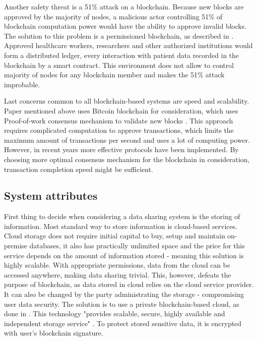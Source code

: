 \documentclass[12pt]{article}
\begin{document}
        Another safety threat is a 51\% attack on a blockchain. Because new blocks are approved by the majority of nodes, a malicious actor controlling 51\% of blockchain computation power would have the ability to approve invalid blocks. The solution to this problem is a permissioned blockchain, as described in \cite{permissioned}. Approved healthcare workers, researchers and other authorized institutions would form a distributed ledger, every interaction with patient data recorded in the blockchain by a smart contract. This environment does not allow to control majority of nodes for any blockchain member and makes the 51\% attack improbable.

        Last concerns common to all blockchain-based systems are speed and scalability. Paper mentioned above uses Bitcoin blockchain for consideration, which uses Proof-of-work consensus mechanism to validate new blocks \cite{dlt}. This approach requires complicated computation to approve transactions, which limits the maximum amount of transactions per second and uses a lot of computing power. However, in recent years more effective protocols have been implemented. By choosing more optimal consensus mechanism for the blockchain in consideration, transaction completion speed might be sufficient.

        \subsection{System attributes}
        First thing to decide when considering a data sharing system is the storing of information. Most standard way to store information is cloud-based services. Cloud storage does not require initial capital to buy, setup and maintain on-premise databases, it also has practically unlimited space and the price for this service depends on the amount of information stored - meaning this solution is highly scalable. With appropriate permissions, data from the cloud can be accessed anywhere, making data sharing trivial. This, however, defeats the purpose of blockchain, as data stored in cloud relies on the cloud service provider. It can also be changed by the party administrating the storage - compromising user data security. The solution is to use a private blockchain-based cloud, as done in \cite{gateways}. This technology "provides scalable, secure, highly available and independent storage service" \cite{gateways}. To protect stored sensitive data, it is encrypted with user's blockchain signature.
\end{document}
